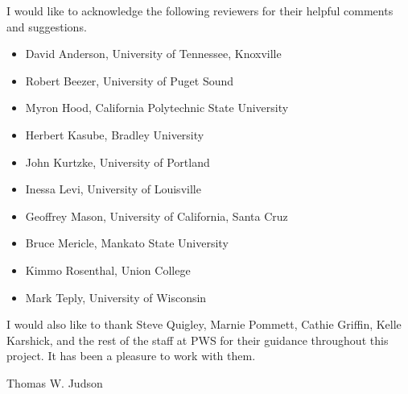  
I would like to acknowledge the following reviewers for their helpful
comments and suggestions. 
\begin{itemize}
 
\item
David Anderson,
University of Tennessee, Knoxville

\item
Robert Beezer,
University of Puget Sound

\item
Myron Hood,
California Polytechnic State University

\item
Herbert Kasube,
Bradley University

\item
John Kurtzke,
University of Portland
 
\item
Inessa Levi,
University of Louisville
 
\item
Geoffrey Mason,
University of California, Santa Cruz

\item
Bruce Mericle,
Mankato State University
 
\item
Kimmo Rosenthal,
Union College

\item
Mark Teply,
University of Wisconsin

\end{itemize}
I would also like to thank Steve Quigley, Marnie Pommett, Cathie
Griffin, Kelle Karshick, and the rest of the staff at PWS for their
guidance throughout this project. It has been a pleasure to work with
them. 

 
\begin{flushright}
Thomas W. Judson
\end{flushright}
 
 
\pagestyle{headings}
 
 
 
 
